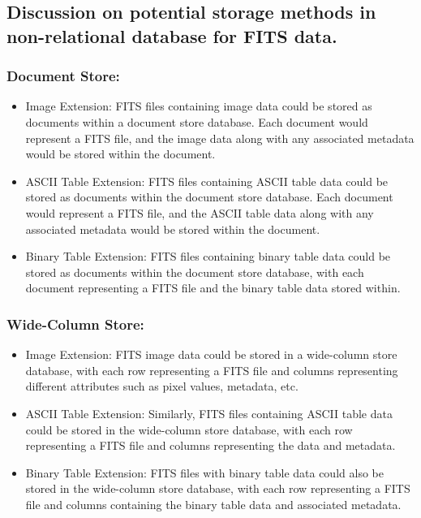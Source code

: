 \documentclass[a4paper,oneside,11pt]{book}
\begin{document}
\subsection{Discussion on potential storage methods in non-relational database for FITS data.}
\subsubsection{Document Store:}
\begin{itemize}
    \item Image Extension: FITS files containing image data could be stored as documents within a document store database. Each document would represent a FITS file, and the image data along with any associated metadata would be stored within the document.
    \item ASCII Table Extension: FITS files containing ASCII table data could be stored as documents within the document store database. Each document would represent a FITS file, and the ASCII table data along with any associated metadata would be stored within the document.
    \item Binary Table Extension: FITS files containing binary table data could  be stored as documents within the document store database, with each document representing a FITS file and the binary table data stored within.
\end{itemize}
\subsubsection{Wide-Column Store:}
\begin{itemize}
    \item Image Extension: FITS image data could be stored in a wide-column store database, with each row representing a FITS file and columns representing different attributes such as pixel values, metadata, etc.
    \item ASCII Table Extension: Similarly, FITS files containing ASCII table data could be stored in the wide-column store database, with each row representing a FITS file and columns representing the data and metadata.
    \item Binary Table Extension: FITS files with binary table data could also be stored in the wide-column store database, with each row representing a FITS file and columns containing the binary table data and associated metadata.
\end{itemize}
\end{document}

